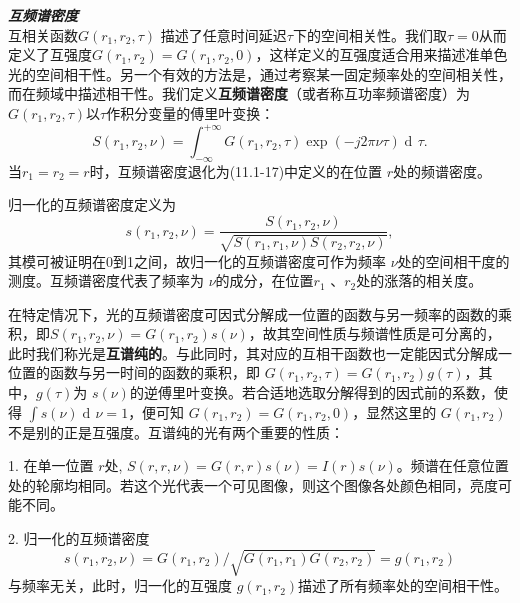 \documentclass[UTF8]{ctexart}
\numberwithin{figure}{subsection}
\numberwithin{table}{subsection}
\DeclareMathOperator\dif{d\!}
\begin{document}
\bigbreak\noindent\textcolor{ksc}{\textbf{\textsl{互频谱密度}}}\\
互相关函数$ G(r_1, r_2, \tau) $ 描述了任意时间延迟$ \tau $下的空间相关性。我们取$ \tau = 0 $从而定义了互强度$ G(r_1, r_2) = G(r_1, r_2, 0) $，这样定义的互强度适合用来描述准单色光的空间相干性。另一个有效的方法是，通过考察某一固定频率处的空间相关性，而在频域中描述相干性。我们定义\textbf{互频谱密度}（或者称互功率频谱密度）为$ G(r_1, r_2, \tau) $以$ \tau $作积分变量的傅里叶变换：
\begin{equation}
S(r_1, r_2, \nu) = \int_{-\infty}^{+\infty}G(r_1, r_2, \tau) \exp(-j2\pi \nu \tau) \dif \tau .
\end{equation}
当$ r_1 = r_2 = r $时，互频谱密度退化为(11.1-17)中定义的在位置 $ r $处的频谱密度。
\par 归一化的互频谱密度定义为
\begin{equation}
s(r_1, r_2, \nu) = \frac{S(r_1, r_2, \nu)}{\sqrt{S(r_1, r_1, \nu)S(r_2, r_2, \nu)}} ,
\end{equation}
其模可被证明在0到1之间，故归一化的互频谱密度可作为频率 $ \nu $处的空间相干度的测度。互频谱密度代表了频率为 $ \nu $的成分，在位置$ r_1 $ 、$ r_2 $处的涨落的相关度。
\par 在特定情况下，光的互频谱密度可因式分解成一位置的函数与另一频率的函数的乘积，即$ S(r_1, r_2, \nu) = G(r_1, r_2) s(\nu) $，故其空间性质与频谱性质是可分离的，此时我们称光是\textbf{互谱纯的}。与此同时，其对应的互相干函数也一定能因式分解成一位置的函数与另一时间的函数的乘积，即 $ G(r_1, r_2, \tau) = G(r_1, r_2) g(\tau) $，其中，$ g(\tau) $为 $ s(\nu) $的逆傅里叶变换。若合适地选取分解得到的因式前的系数，使得 $ \int s(\nu) \dif \nu = 1 $，便可知 $ G(r_1, r_2) = G(r_1, r_2, 0) $，显然这里的 $G(r_1, r_2) $不是别的正是互强度。互谱纯的光有两个重要的性质：
\par 1. 在单一位置 $ r $处, $ S(r, r, \nu) = G(r, r) s(\nu) = I(r) s(\nu) $。频谱在任意位置处的轮廓均相同。若这个光代表一个可见图像，则这个图像各处颜色相同，亮度可能不同。
\par 2. 归一化的互频谱密度
\begin{equation}
s(r_1, r_2, \nu) = G(r_1, r_2) / \sqrt{G(r_1, r_1) G(r_2, r_2)} = g(r_1, r_2)
\end{equation}
与频率无关，此时，归一化的互强度 $ g(r_1, r_2) $描述了所有频率处的空间相干性。

\bigbreak\begingroup
\color{ksc}
\end{document}
